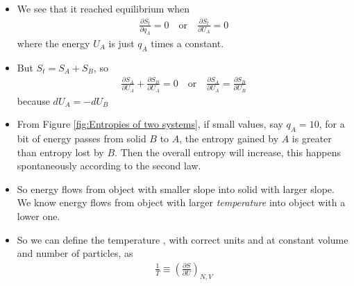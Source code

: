 \documentclass{book}
\begin{document}
\begin{itemize}
	\item We see that it reached equilibrium when
	      \begin{align}
		      \frac{\partial S_{t}}{\partial q_A} = 0
		      \quad \text{or} \quad \frac{\partial S_{t}}{\partial U_A} = 0
	      \end{align}
	      where the energy $U_A$ is just $q_A$ times a constant.
	\item But $S_t = S_A + S_B$, so
	      \begin{align}
		      \frac{\partial S_A}{\partial U_A} + \frac{\partial S_B}{\partial U_A} = 0 \quad \text{or} \quad
		      \frac{\partial S_A}{\partial U_A} = \frac{\partial S_B}{\partial U_B}
	      \end{align}
	      because $dU_A = -dU_B$
  \item From Figure \ref{fig:Entropies of two systems}, if small values, say $q_A= 10$, for a bit of energy
				passes from solid $B$ to $A$, the entropy gained by $A$ is greater than entropy lost by $B$. Then the overall
				entropy will increase, this happens spontaneously according to the second law.
	\item So energy flows from object with smaller slope into solid with larger slope. We know energy flows from
				object with larger \textit{temperature} into object with a lower one.
	\item So we can define the temperature , with correct units and at constant volume and
				number of particles, as
				\begin{align}
					\frac{1}{T} \equiv \left( \frac{\partial S}{\partial U} \right)_{N,V}
				\end{align}

\end{itemize}
\end{document}

